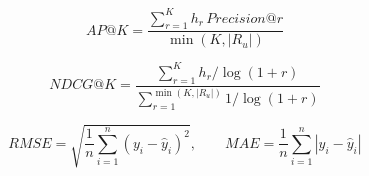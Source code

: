 \[
AP@K=\frac{\sum_{r=1}^{K}h_r\,Precision@r}{\min(K,|R_u|)}
\]

\[
NDCG@K=\frac{\sum_{r=1}^{K}h_r/\log(1+r)}{\sum_{r=1}^{\min(K,|R_u|)}1/\log(1+r)}
\]

\[
RMSE=\sqrt{\frac{1}{n}\sum_{i=1}^{n}(y_i-\hat y_i)^2},\qquad MAE=\frac{1}{n}\sum_{i=1}^{n}|y_i-\hat y_i|
\]